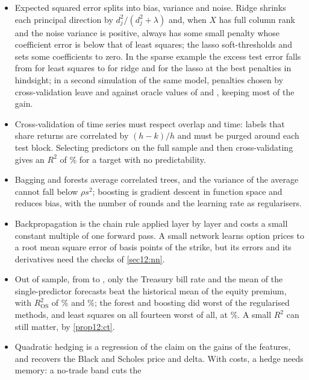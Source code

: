 \begin{chapterrefs}
\begin{itemize}
  \item Expected squared error splits into bias, variance and noise. Ridge shrinks each principal direction by
        $d_j^2/(d_j^2+\lambda)$ and, when $X$ has full column rank and the noise variance is positive, always has some small
        penalty whose coefficient error is below that of least squares; the lasso
        soft-thresholds and sets some coefficients to zero. In the sparse example the excess test error falls
        from \bvOlsErr{} for least squares to \bvRidgeErr{} for ridge and \bvLassoErr{} for the lasso
        at the best penalties in hindsight; in a second simulation of the same model, penalties chosen by
        cross-validation leave \cvRidgeErrCv{} and \cvLassoErrCv{} against oracle values of
        \cvRidgeErrOracle{} and \cvLassoErrOracle, keeping most of the gain.
  \item Cross-validation of time series must respect overlap and time: labels that share returns are
        correlated by $(h-k)/h$ and must be purged around each test block. Selecting predictors on the
        full sample and then cross-validating gives an $R^2$ of \kfSelOut\% for a target with no
        predictability.
  \item Bagging and forests average correlated trees, and the variance of the average cannot fall below $\rho s^2$; boosting
        is gradient descent in function space and reduces bias, with the number of rounds and the learning rate as regularisers.
  \item Backpropagation is the chain rule applied layer by layer and costs a small constant multiple of one forward pass. A small
        network learns option prices to a root mean square error of \nnRmse{} basis points of the strike, but its errors and its derivatives need the
        checks of \cref{sec12:nn}.
  \item Out of sample, from \eqOosFrom{} to \eqOosTo, only the Treasury bill rate and the mean of the
        single-predictor forecasts beat the historical mean of the equity premium, with
        $R^2_{\mathrm{OS}}$ of \eqRtwoTbl\% and \eqRtwoComb\%; the forest and boosting did worst of the regularised methods, and least squares on all
        fourteen worst of all, at \eqRtwoOls\%. A small $R^2$ can still matter, by \cref{prop12:ct}.
  \item Quadratic hedging is a regression of the claim on the gains of the features, and recovers the
        Black and Scholes price and delta. With costs, a hedge needs memory: a no-trade band cuts the

\end{itemize}
\end{chapterrefs}
